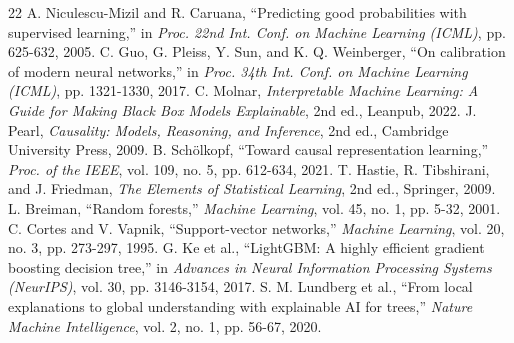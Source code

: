 \documentclass[conference]{IEEEtran}
\begin{document}
\begin{thebibliography}{22}
 A. Niculescu-Mizil and R. Caruana, ``Predicting good probabilities with supervised learning,'' in \textit{Proc. 22nd Int. Conf. on Machine Learning (ICML)}, pp. 625-632, 2005.
 C. Guo, G. Pleiss, Y. Sun, and K. Q. Weinberger, ``On calibration of modern neural networks,'' in \textit{Proc. 34th Int. Conf. on Machine Learning (ICML)}, pp. 1321-1330, 2017.
 C. Molnar, \textit{Interpretable Machine Learning: A Guide for Making Black Box Models Explainable}, 2nd ed., Leanpub, 2022.
 J. Pearl, \textit{Causality: Models, Reasoning, and Inference}, 2nd ed., Cambridge University Press, 2009.
 B. Schölkopf, ``Toward causal representation learning,'' \textit{Proc. of the IEEE}, vol. 109, no. 5, pp. 612-634, 2021.
 T. Hastie, R. Tibshirani, and J. Friedman, \textit{The Elements of Statistical Learning}, 2nd ed., Springer, 2009.
 L. Breiman, ``Random forests,'' \textit{Machine Learning}, vol. 45, no. 1, pp. 5-32, 2001.
 C. Cortes and V. Vapnik, ``Support-vector networks,'' \textit{Machine Learning}, vol. 20, no. 3, pp. 273-297, 1995.
 G. Ke et al., ``LightGBM: A highly efficient gradient boosting decision tree,'' in \textit{Advances in Neural Information Processing Systems (NeurIPS)}, vol. 30, pp. 3146-3154, 2017.
 S. M. Lundberg et al., ``From local explanations to global understanding with explainable AI for trees,'' \textit{Nature Machine Intelligence}, vol. 2, no. 1, pp. 56-67, 2020.
\end{thebibliography}
\end{document}
